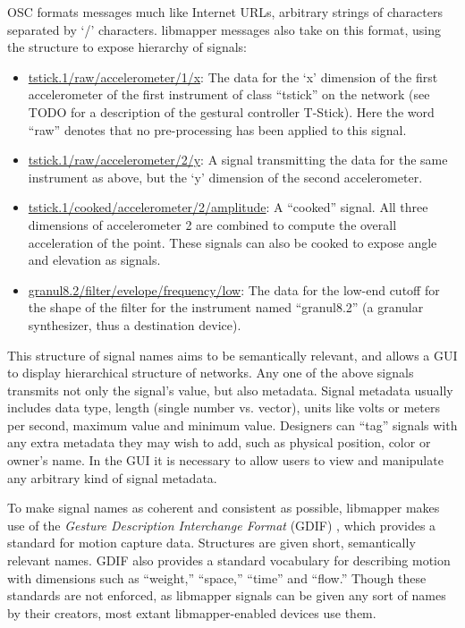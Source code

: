 OSC formats messages much like Internet URLs, arbitrary strings of characters separated by `/' characters. libmapper messages also take on this format, using the structure to expose hierarchy of signals:

	\begin{itemize}
	\item\url{tstick.1/raw/accelerometer/1/x}: The data for the `x' dimension of the first accelerometer of the first instrument of class ``tstick'' on the network (see TODO for a description of the gestural controller T-Stick). Here the word ``raw'' denotes that no pre-processing has been applied to this signal. 
	\item\url{tstick.1/raw/accelerometer/2/y}: A signal transmitting the data for the same instrument as above, but the `y' dimension of the second accelerometer.
	\item\url{tstick.1/cooked/accelerometer/2/amplitude}: A ``cooked'' signal. All three dimensions of accelerometer 2 are combined to compute the overall acceleration of the point. These signals can also be cooked to expose angle and elevation as signals.
	\item\url{granul8.2/filter/evelope/frequency/low}: The data for the low-end cutoff for the shape of the filter for the instrument named ``granul8.2'' (a granular synthesizer, thus a destination device).
	\end{itemize}

This structure of signal names aims to be semantically relevant, and allows a GUI to display hierarchical structure of networks. Any one of the above signals transmits not only the signal's value, but also metadata. Signal metadata usually includes data type, length (single number vs. vector), units like volts or meters per second, maximum value and minimum value. Designers can ``tag'' signals with any extra metadata they may wish to add, such as physical position, color or owner's name. In the GUI it is necessary to allow users to view and manipulate any arbitrary kind of signal metadata.

To make signal names as coherent and consistent as possible, libmapper makes use of the \emph{Gesture Description Interchange Format} (GDIF) , which provides a standard for motion capture data. Structures are given short, semantically relevant names. GDIF also provides a standard vocabulary for describing motion with dimensions such as ``weight,'' ``space,'' ``time'' and ``flow.'' Though these standards are not enforced, as libmapper signals can be given any sort of names by their creators, most extant libmapper-enabled devices use them.

